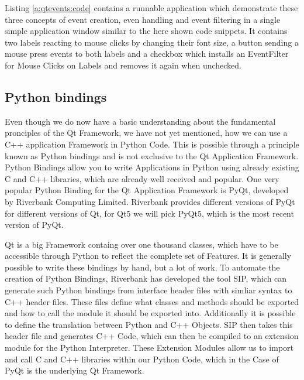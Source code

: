 

Listing \ref{a:qtevents:code} contains a runnable application which demonstrate
these three concepts of event creation, even handling and event filtering in a
single simple application window similar to the here shown code snippets. It
contains two labels reacting to mouse clicks by changing their font size, a
button sending a mouse press events to both labels and a checkbox which installs
an EventFilter for Mouse Clicks on Labels and removes it again when unchecked.
\cite{EventSystem,AnotherLookAtEvents,EventFilters}





\subsection{Python bindings}
\label{sec:fundamentals:qt:pyqt}

Even though we do now have a basic understanding about the fundamental
pronciples of the Qt Framework, we have not yet mentioned, how we can use a C++
application Framework in Python Code. This is possible through a principle known
as Python bindings and is not exclusive to the Qt Application Framework. Python
Bindings allow you to write Applications in Python using already existing C and
C++ libraries, which are already well received and popular. One very popular
Python Binding for the Qt Application Framework is PyQt, developed by Riverbank
Computing Limited. Riverbank provides different versions of PyQt for different
versions of Qt, for Qt5 we will pick PyQt5, which is the most recent version of
PyQt.  \cite{PyQtIntro}

Qt is a big Framework containg over one thousand classes, which have to be
accessible through Python to reflect the complete set of Features. It is
generally possible to write these bindings by hand, but a lot of work. To
automate the creation of Python Bindings, Riverbank has developed the tool SIP,
which can generate such Python bindings from interface header files with simliar
syntax to C++ header files. These files define what classes and methods should
be exported and how to call the module it should be exported into. Additionally
it is possible to define the translation between Python and C++ Objects.  SIP
then takes this header file and generates C++ Code, which can then be compiled
to an extension module for the Python Interpreter. These Extension Modules allow
us to import and call C and C++ libraries within our Python Code, which in the
Case of PyQt is the underlying Qt Framework.
\cite{SipIntro, SipTut, ExtendingPython}

